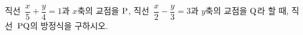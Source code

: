 직선~$\dfrac{x}{5}+\dfrac{y}{4}=1$과 $x$축의 교점을 $\mathrm{P}$, 직선~$\dfrac{x}{2}-\dfrac{y}{3}=3$과 $y$축의 교점을 $\mathrm{Q}$라 할 때, 직선~$\mathrm{PQ}$의 방정식을 구하시오.

